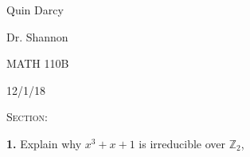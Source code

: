 \documentclass[12pt, a4paper]{article}
\begin{document}
  
 \begin{flushleft}
  
    Quin Darcy\par
    Dr. Shannon\par
    MATH 110B\par
    12/1/18
  
 \end{flushleft}
  
 \centerline{}
 
 \vspace{4mm}
 
 \noindent\textsc{Section: }\par
 
 \justifying
 
 \vspace{1mm}
 
 \hline
 
 \vspace{4mm}
 
 \noindent\textbf{1.} Explain why $x^3+x+1$ is irreducible over $\mathbb{Z}_2$, 
\end{document}
